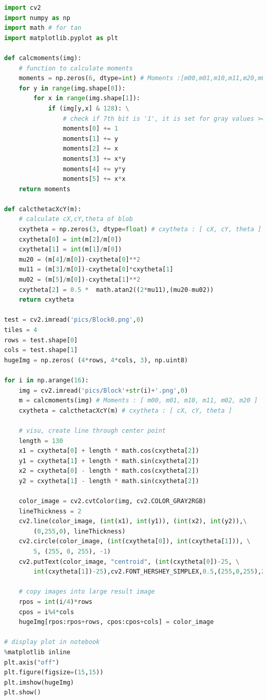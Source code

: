 \documentclass[a4paper]{report}
\begin{document}
\begin{lstlisting}[language=Python, caption=Simulation Numeric]
import cv2
import numpy as np 
import math # for tan
import matplotlib.pyplot as plt

def calcmoments(img):
    # function to calculate moments
    moments = np.zeros(6, dtype=int) # Moments :[m00,m01,m10,m11,m20,m02]
    for y in range(img.shape[0]):
        for x in range(img.shape[1]):
            if (img[y,x] & 128): \
            	# check if 7th bit is '1', it is set for gray values >=128
                moments[0] += 1
                moments[1] += y
                moments[2] += x
                moments[3] += x*y
                moments[4] += y*y
                moments[5] += x*x
    return moments
    
def calcthetacXcY(m):
    # calculate cX,cY,theta of blob
    cxytheta = np.zeros(3, dtype=float) # cxytheta : [ cX, cY, theta ]
    cxytheta[0] = int(m[2]/m[0])
    cxytheta[1] = int(m[1]/m[0])
    mu20 = (m[4]/m[0])-cxytheta[0]**2
    mu11 = (m[3]/m[0])-cxytheta[0]*cxytheta[1]
    mu02 = (m[5]/m[0])-cxytheta[1]**2
    cxytheta[2] = 0.5 *  math.atan2((2*mu11),(mu20-mu02))
    return cxytheta
    
test = cv2.imread('pics/Block0.png',0)
tiles = 4
rows = test.shape[0]
cols = test.shape[1]
hugeImg = np.zeros( (4*rows, 4*cols, 3), np.uint8)

for i in np.arange(16):
    img = cv2.imread('pics/Block'+str(i)+'.png',0)
    m = calcmoments(img) # Moments : [ m00, m01, m10, m11, m02, m20 ]
    cxytheta = calcthetacXcY(m) # cxytheta : [ cX, cY, theta ]

    # visu, create line through center point
    length = 130
    x1 = cxytheta[0] + length * math.cos(cxytheta[2])
    y1 = cxytheta[1] + length * math.sin(cxytheta[2]) 
    x2 = cxytheta[0] - length * math.cos(cxytheta[2])
    y2 = cxytheta[1] - length * math.sin(cxytheta[2]) 
 
    color_image = cv2.cvtColor(img, cv2.COLOR_GRAY2RGB)
    lineThickness = 2
    cv2.line(color_image, (int(x1), int(y1)), (int(x2), int(y2)),\
    	(0,255,0), lineThickness)
    cv2.circle(color_image, (int(cxytheta[0]), int(cxytheta[1])), \
    	5, (255, 0, 255), -1)
    cv2.putText(color_image, "centroid", (int(cxytheta[0])-25, \
    	int(cxytheta[1])-25),cv2.FONT_HERSHEY_SIMPLEX,0.5,(255,0,255),2)
    
    # copy images into large result image
    rpos = int(i/4)*rows
    cpos = i%4*cols
    hugeImg[rpos:rpos+rows, cpos:cpos+cols] = color_image

# display plot in notebook
%matplotlib inline
plt.axis("off")
plt.figure(figsize=(15,15))
plt.imshow(hugeImg)
plt.show()

\end{lstlisting}
\end{document}
